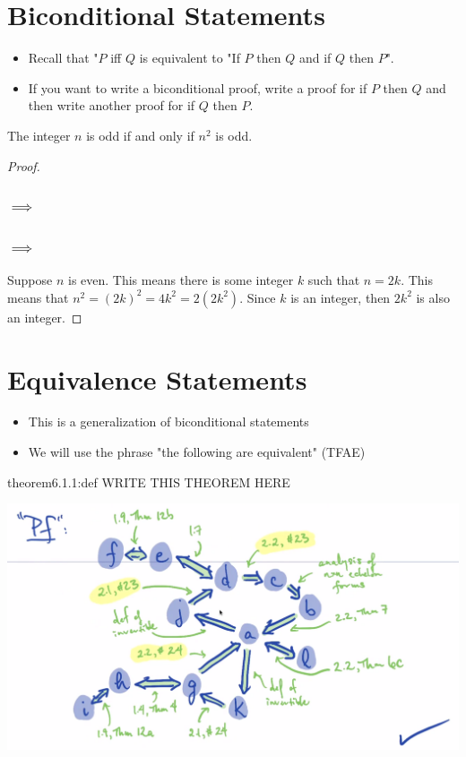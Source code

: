 \section{Biconditional Statements}

\begin{itemize}
    \item Recall that "$P$ iff $Q$ is equivalent to "If $P$ then $Q$ and if $Q$ then $P$".
    \item If you want to write a biconditional proof, write a proof for if $P$ then $Q$ and then write another proof for if $Q$ then $P$. 
\end{itemize}

\begin{proposition}
    The integer $n$ is odd if and only if $n^2$ is odd. 
\end{proposition}

\begin{proof}
    \subsubsection*{$\implies$}


    \subsubsection{$\implies$}

    Suppose $n$ is even. This means there is some integer $k$ such that $n = 2k$. This means that $n^2 = (2k)^2 = 4k^2 = 2(2k^2)$. Since $k$ is an integer, then $2k^2$ is also an integer. 
\end{proof}


\section{Equivalence Statements}

\begin{itemize}
    \item This is a generalization of biconditional statements
    \item We will use the phrase "the following are equivalent" (TFAE)
\end{itemize}

\begin{theorem}{theorem6.1.1:def}
    WRITE THIS THEOREM HERE
\end{theorem}

    \begin{center}
        \includegraphics[width=1\textwidth]{chapters/ch6/images/fig6.1.PNG}
    \end{center}